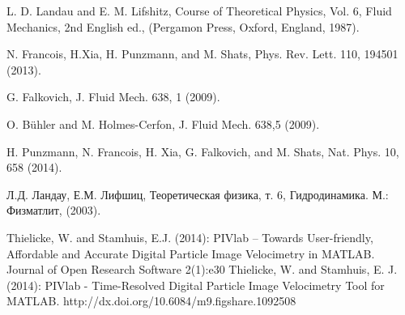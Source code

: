 \begin{thebibliography}{99}
L. D. Landau and E. M. Lifshitz, Course of Theoretical Physics, Vol. 6, Fluid Mechanics, 2nd English ed., (Pergamon Press, Oxford, England, 1987).


N. Francois, H.Xia, H. Punzmann, and M. Shats, Phys. Rev. Lett. 110, 194501 (2013).





G. Falkovich, J. Fluid Mech. 638, 1 (2009).

O. Bühler and M. Holmes-Cerfon, J. Fluid Mech. 638,5 (2009).

H. Punzmann, N. Francois, H. Xia, G. Falkovich, and M. Shats, Nat. Phys. 10, 658 (2014).







Л.Д. Ландау, Е.М. Лифшиц, Теоретическая физика, т. 6, Гидродинамика. М.: Физматлит, (2003).

Thielicke, W. and Stamhuis, E.J. (2014): PIVlab – Towards User-friendly, Affordable and Accurate Digital Particle Image Velocimetry in MATLAB. Journal of Open Research Software 2(1):e30
Thielicke, W. and Stamhuis, E. J. (2014): PIVlab - Time-Resolved Digital Particle Image Velocimetry Tool for MATLAB. http://dx.doi.org/10.6084/m9.figshare.1092508 





\end{thebibliography}

